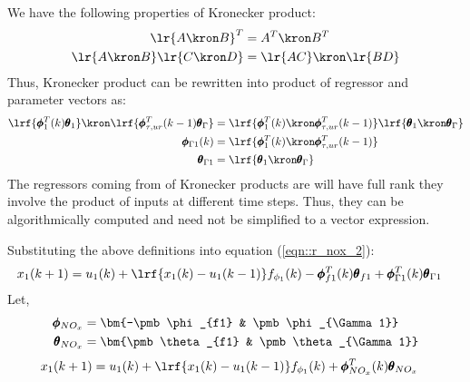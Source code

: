We have the following properties of Kronecker product:
        \begin{align*}
                \lr{A \kron B}^T &= A^T \kron B^T \\
                \lr{A \kron B} \lr{C \kron D} &= \lr{AC} \kron \lr{BD}
        \end{align*}
Thus, Kronecker product can be rewritten into product of regressor and parameter vectors as:
\begin{align*}
        \lrf{\pmb \phi_1^T(k) \pmb \theta_1} \kron \lrf{\pmb \phi^T_{\tau, ur}(k-1) \pmb \theta_\Gamma} &=
             \lrf{ \pmb \phi_1^T(k) \kron \pmb \phi^T_{\tau, ur}(k-1) }
             \lrf{\pmb \theta_1 \kron \pmb \theta_\Gamma}\\
        \pmb \phi_{\Gamma 1} (k) &= \lrf{ \pmb \phi_1^T(k) \kron \pmb \phi^T_{\tau, ur}(k-1) } \\
        \pmb \theta_{\Gamma 1} &= \lrf{\pmb \theta_1 \kron \pmb \theta_\Gamma}
\end{align*}
The regressors coming from  of Kronecker products are will have full rank they involve the product of inputs at different time steps. Thus, they can be algorithmically computed and need not be simplified to a vector expression.

Substituting the above definitions into equation (\ref{eqn::r_nox_2}):
\begin{align}
         x_1(k+1) &=  u_1(k)  + \lrf{{x_1(k) - u_1(k-1)}} f_{\phi_1}(k) -
                     \pmb \phi_{f1}^T(k) \pmb \theta_{f1} +
                     \pmb \phi_{\Gamma 1}^T(k) \pmb \theta_{\Gamma 1}
        \label{eqn::r_nox_3}
\end{align}
Let,
\begin{align}
        \pmb \phi_{NO_x} &= \bm{-\pmb \phi_{f1} & \pmb \phi_{\Gamma 1}}\\
        \pmb \theta_{NO_x} &= \bm{\pmb \theta_{f1} & \pmb \theta_{\Gamma 1}}
\end{align}
\begin{align}
          x_1(k+1) &=  u_1(k)  + \lrf{{x_1(k) - u_1(k-1)}} f_{\phi_1}(k) +
                     \pmb \phi_{NO_x}^T (k) \pmb \theta_{NO_x}
        \label{eqn::r_nox_regression}
\end{align}




